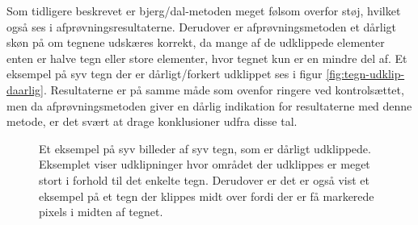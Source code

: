 Som tidligere beskrevet er bjerg/dal-metoden meget følsom overfor støj, hvilket også ses i afprøvningsresultaterne. Derudover er afprøvningsmetoden et dårligt skøn på om tegnene udskæres korrekt, da mange af de udklippede elementer enten er halve tegn eller store elementer, hvor tegnet kun er en mindre del af. Et eksempel på syv tegn der er dårligt/forkert udklippet ses i figur \vref{fig:tegn-udklip-daarlig}. Resultaterne er på samme måde som ovenfor ringere ved kontrolsættet, men da afprøvningsmetoden giver en dårlig indikation for resultaterne med denne metode, er det svært at drage konklusioner udfra disse tal.

\begin{figure}[htp]
  \centering
  \begin{minipage}[c]{8 cm}
	\end{minipage}
  \caption{Et eksempel på syv billeder af syv tegn, som er dårligt udklippede. Eksemplet viser udklipninger hvor området der udklippes er meget stort i forhold til det enkelte tegn. Derudover er det er også vist et eksempel på et tegn der klippes midt over fordi der er få markerede pixels i midten af tegnet.}
  \label{fig:tegn-udklip-daarlig}
\end{figure}

